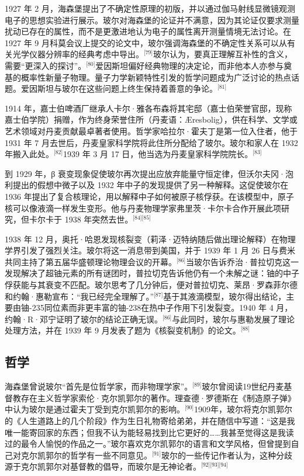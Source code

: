 1927 年 2 月，海森堡提出了不确定性原理的初版，并以通过伽马射线显微镜观测电子的思想实验进行展示。玻尔对海森堡的论证并不满意，因为其论证仅要求测量扰动已存在的属性，而不是更激进地认为电子的属性离开测量情境无法讨论。在 1927 年 9 月科莫会议上提交的论文中，玻尔强调海森堡的不确定性关系可以从有关光学仪器分辨率的经典考虑中导出。\(^\text{[79]}\)玻尔认为，要真正理解互补性的含义，需要“更深入的探讨”。\(^\text{[80]}\)爱因斯坦偏好经典物理的决定论，而非他本人亦参与奠基的概率性新量子物理。量子力学新颖特性引发的哲学问题成为广泛讨论的热点话题。爱因斯坦与玻尔在这些问题上终生保持着善意的争论。\(^\text{[81]}\)

1914 年，嘉士伯啤酒厂继承人卡尔·雅各布森将其宅邸（嘉士伯荣誉官邸，现称嘉士伯学院）捐赠，作为终身荣誉住所（丹麦语：Æresbolig），供在科学、文学或艺术领域对丹麦贡献最卓著者使用。哲学家哈拉尔·霍夫丁是第一位入住者，他于 1931 年 7 月去世后，丹麦皇家科学院将此住所分配给了玻尔。玻尔和家人在 1932 年搬入此处。\(^\text{[82]}\)1939 年 3 月 17 日，他当选为丹麦皇家科学院院长。\(^\text{[83]}\)

到 1929 年，β 衰变现象促使玻尔再次提出应放弃能量守恒定律，但沃尔夫冈·泡利提出的假想中微子以及 1932 年中子的发现提供了另一种解释。这促使玻尔在 1936 年提出了复合核理论，用以解释中子如何被原子核俘获。在该模型中，原子核可以像液滴一样发生变形。他与丹麦物理学家弗里茨·卡尔卡合作开展此项研究，但卡尔卡于 1938 年突然去世。\(^\text{[84][85]}\)

1938 年 12 月，奥托·哈恩发现核裂变（莉泽·迈特纳随后做出理论解释）在物理学界引发了强烈关注。玻尔将这一消息带到美国，并于 1939 年 1 月 26 日与费米共同主持了第五届华盛顿理论物理会议的开幕。\(^\text{[86]}\)当玻尔告诉乔治·普拉切克这一发现解决了超铀元素的所有谜团时，普拉切克告诉他仍有一个未解之谜：铀的中子俘获能与其衰变不匹配。玻尔思考了几分钟后，便对普拉切克、莱昂·罗森菲尔德和约翰·惠勒宣布：“我已经完全理解了。”\(^\text{[87]}\)基于其液滴模型，玻尔得出结论，主要由铀-235同位素而非更丰富的铀-238在热中子作用下引发裂变。1940 年 4 月，约翰·R·邓宁证明了玻尔的结论正确无误。\(^\text{[86]}\)与此同时，玻尔与惠勒发展了理论处理方法，并在 1939 年 9 月发表了题为《核裂变机制》的论文。\(^\text{[88]}\)
\subsection{哲学}
海森堡曾说玻尔“首先是位哲学家，而非物理学家”。\(^\text{[89]}\)玻尔曾阅读19世纪丹麦基督教存在主义哲学家索伦·克尔凯郭尔的著作。理查德·罗德斯在《制造原子弹》中认为玻尔是通过霍夫丁受到克尔凯郭尔的影响。\(^\text{[90]}\)1909年，玻尔将克尔凯郭尔的《人生道路上的几个阶段》作为生日礼物寄给弟弟，并在随信中写道：“这是我唯一能寄回家的东西；但我不认为能轻易找到比它更好的……我甚至觉得这是我读过的最令人愉悦的作品之一。”玻尔喜欢克尔凯郭尔的语言和文学风格，但曾提到自己对克尔凯郭尔的哲学有一些不同意见。\(^\text{[91]}\)玻尔的一些传记作者认为，这种分歧源于克尔凯郭尔对基督教的倡导，而玻尔是无神论者。\(^\text{[92][93][94]}\)


